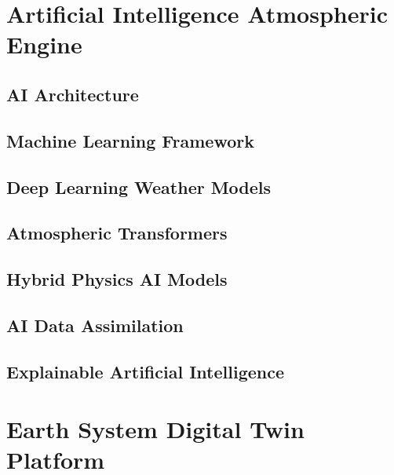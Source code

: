 \documentclass[11pt,a4paper,oneside]{report}
\begin{document}

\part{Artificial Intelligence Atmospheric Engine}


\chapter{AI Architecture}



\chapter{Machine Learning Framework}



\chapter{Deep Learning Weather Models}



\chapter{Atmospheric Transformers}



\chapter{Hybrid Physics AI Models}



\chapter{AI Data Assimilation}



\chapter{Explainable Artificial Intelligence}



\part{Earth System Digital Twin Platform}
\end{document}
